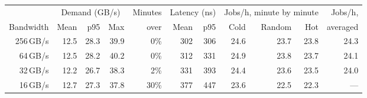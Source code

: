 \begin{tabular}{rrrrrrrrrrr}
\toprule
 & \multicolumn{3}{c}{Demand (GB/s)} & Minutes & \multicolumn{2}{c}{Latency (ns)} & \multicolumn{3}{c}{Jobs/h, minute by minute} & Jobs/h, \\
\cmidrule(lr){2-4}\cmidrule(lr){6-7}\cmidrule(lr){8-10}
Bandwidth & Mean & p95 & Max & over & Mean & p95 & Cold & Random & Hot & averaged \\
\midrule
256\,GB/s & 12.5 & 28.3 & 39.9 & 0\% & 302 & 306 & 24.6 & 23.7 & 23.8 & 24.3 \\
64\,GB/s & 12.5 & 28.2 & 40.2 & 0\% & 312 & 331 & 24.9 & 23.8 & 23.7 & 24.1 \\
32\,GB/s & 12.2 & 26.7 & 38.3 & 2\% & 331 & 393 & 24.4 & 23.6 & 23.5 & 24.0 \\
16\,GB/s & 12.7 & 27.3 & 37.8 & 30\% & 377 & 447 & 23.6 & 22.5 & 22.3 & --- \\
\bottomrule
\end{tabular}
